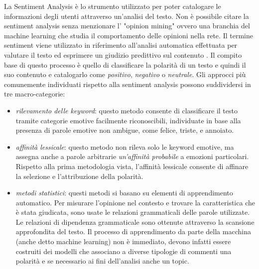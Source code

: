 La Sentiment Analysis è lo strumento utilizzato per poter catalogare le informazioni degli utenti attraverso un'analisi del testo. Non è possibile citare la sentiment analysis senza menzionare l' "opinion mining" ovvero una branchia del machine learning che studia il comportamento delle opinioni nella rete.
Il termine sentiment viene utilizzato in riferimento all'analisi automatica effettuata per valutare il testo ed esprimere un giudizio predittivo sul contenuto \cite{pang2015sentiment}.
Il compito base di questo processo è quello di classificare la polarità di un testo e quindi il suo contenuto e catalogarlo come \textit{positivo}, \textit{negativo} o \textit{neutrale}.
Gli approcci più comunemente individuati rispetto alla sentiment analysis possono suddividersi in tre macro-categorie: 
\begin{itemize}
\item \textit{rilevamento delle keyword}: questo metodo consente di classificare il testo tramite categorie emotive facilmente riconoscibili, individuate in base alla presenza di parole emotive non ambigue, come felice, triste, e annoiato.
\item \textit{affinità lessicale}: questo metodo non rileva solo le keyword emotive, ma assegna anche a parole arbitrarie \textit{un'affinità probabile} a emozioni particolari. Rispetto alla prima metodologia vista, l'affinità lessicale consente di affinare la selezione e l'attribuzione della polarità.
\item \textit{metodi statistici}: questi metodi si basano su elementi di apprendimento automatico. Per misurare l'opinione nel contesto e trovare la caratteristica che è stata giudicata, sono usate le relazioni grammaticali delle parole utilizzate. Le relazioni di dipendenza grammaticale sono ottenute attraverso la scansione approfondita del testo. Il processo di apprendimento da parte della macchina (anche detto machine learning) non è immediato, devono infatti essere costruiti dei modelli che associano a diverse tipologie di commenti una polarità e se necessario ai fini dell'analisi anche un topic.
\end{itemize}

